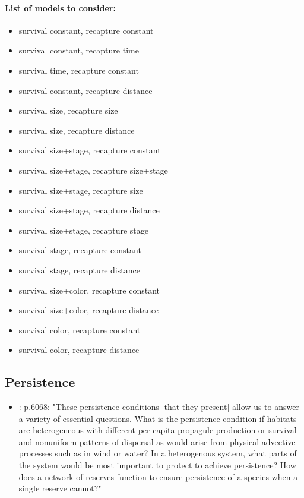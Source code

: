 \documentclass[12pt, oneside]{article}   	%
\begin{document}
\paragraph{List of models to consider:}
\begin{itemize}
	\item survival constant, recapture constant
	\item survival constant, recapture time
	\item survival time, recapture constant
	\item survival constant, recapture distance
	\item survival size, recapture size
	\item survival size, recapture distance
	\item survival size+stage, recapture constant
	\item survival size+stage, recapture size+stage
	\item survival size+stage, recapture size
	\item survival size+stage, recapture distance
	\item survival size+stage, recapture stage
	\item survival stage, recapture constant
	\item survival stage, recapture distance
	\item survival size+color, recapture constant
	\item survival size+color, recapture distance
	\item survival color, recapture constant
	\item survival color, recapture distance
\end{itemize}

\subsection*{Persistence}
\begin{itemize}
\item \citep{hastings_persistence_2006}: p.6068: "These persistence conditions [that they present] allow us to answer a variety of essential questions. What is the persistence condition if habitats are heterogeneous with different per capita propagule production or survival and nonuniform patterns of dispersal as would arise from physical advective processes such as in wind or water? In a heterogenous system, what parts of the system would be most important to protect to achieve persistence? How does a network of reserves function to ensure persistence of a species when a single reserve cannot?"
\end{itemize}
\end{document}
